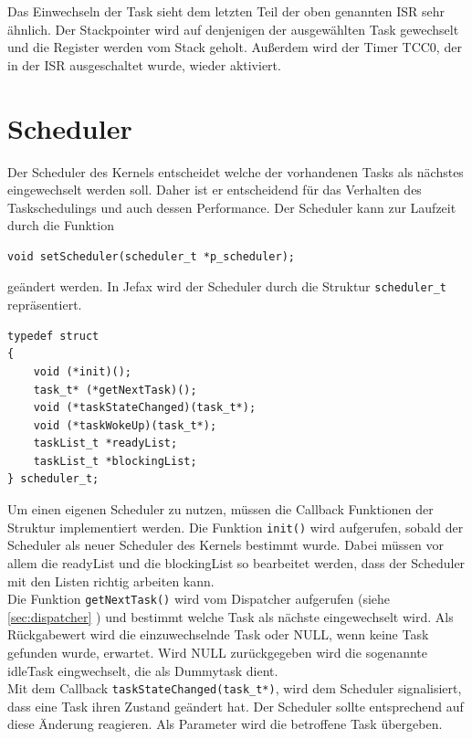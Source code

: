 \documentclass[fontsize=12pt, toc=bibliography, notitlepage]{scrreprt}
\newcommand{\refnn}[1]{\ref{#1} \nameref{#1}}
\begin{document}
Das Einwechseln der Task sieht dem letzten Teil der oben genannten ISR sehr ähnlich. Der Stackpointer wird auf denjenigen der ausgewählten Task gewechselt und die Register werden vom Stack geholt. Außerdem wird der Timer TCC0, der in der ISR ausgeschaltet wurde, wieder aktiviert. 

\newpage

\section{Scheduler}
\label{sec:scheduler}
Der Scheduler des Kernels entscheidet welche der vorhandenen Tasks als nächstes eingewechselt werden soll. Daher ist er entscheidend für das Verhalten des Taskschedulings und auch dessen Performance. Der Scheduler kann zur Laufzeit durch die Funktion

\begin{lstlisting}
void setScheduler(scheduler_t *p_scheduler);
\end{lstlisting}

geändert werden. In Jefax wird der Scheduler durch die Struktur \verb|scheduler_t| repräsentiert.

\begin{lstlisting}[title=scheduler.h]
typedef struct
{
	void (*init)();
	task_t* (*getNextTask)();
	void (*taskStateChanged)(task_t*);
	void (*taskWokeUp)(task_t*);
	taskList_t *readyList;
	taskList_t *blockingList;
} scheduler_t;
\end{lstlisting}

Um einen eigenen Scheduler zu nutzen, müssen die Callback Funktionen der Struktur implementiert werden. Die Funktion \lstinline$init()$ wird aufgerufen, sobald der Scheduler als neuer Scheduler des Kernels bestimmt wurde. Dabei müssen vor allem die readyList und die blockingList so bearbeitet werden, dass der Scheduler mit den Listen richtig arbeiten kann.\\

Die Funktion \lstinline$getNextTask()$ wird vom Dispatcher aufgerufen (siehe \refnn{sec:dispatcher}) und bestimmt welche Task als nächste eingewechselt wird. Als Rückgabewert wird die einzuwechselnde Task oder NULL, wenn keine Task gefunden wurde, erwartet. Wird NULL zurückgegeben wird die sogenannte idleTask eingwechselt, die als Dummytask dient.\\

Mit dem Callback \lstinline$taskStateChanged(task_t*)$, wird dem Scheduler signalisiert, dass eine Task ihren Zustand geändert hat. Der Scheduler sollte entsprechend auf diese Änderung reagieren. Als Parameter wird die betroffene Task übergeben.\\
\end{document}
